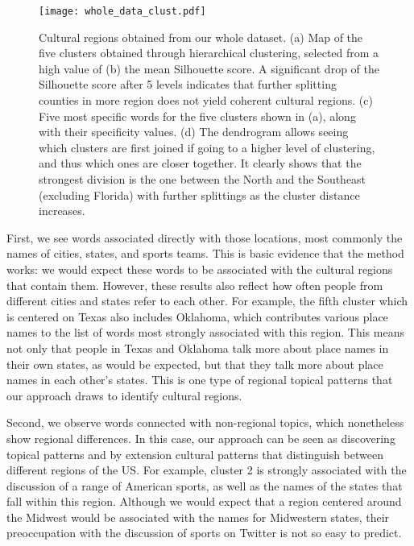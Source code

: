 \documentclass[../thesis.tex]{subfiles}
\begin{document}
\begin{figure}[ht!]
\centering
  \texttt{[image: whole\_data\_clust.pdf]}
  \caption{Cultural regions obtained from our whole dataset. (a) Map of the five
  clusters obtained through hierarchical clustering, selected from a high value of (b)
  the mean Silhouette score. A significant drop of the Silhouette score after 5 levels
  indicates that further splitting counties in more region does not yield coherent
  cultural regions. (c) Five most specific words for the five clusters shown in (a),
  along with their specificity values. (d) The dendrogram allows seeing which clusters
  are first joined if going to a higher level of clustering, and thus which ones are
  closer together. It clearly shows that the strongest division is the one between the
  North and the Southeast (excluding Florida) with further splittings as the cluster
  distance increases.}
  \label{fig:whole_data_clust}
\end{figure}  

First, we see words associated directly with those locations, most commonly the names of
cities, states, and sports teams. This is basic evidence that the method works: we would
expect these words to be associated with the cultural regions that contain them.
However, these results also reflect how often people from different cities and states
refer to each other. For example, the fifth cluster which is centered on Texas also
includes Oklahoma, which contributes various place names to the list of words most
strongly associated with this region. This means not only that people in Texas and
Oklahoma talk more about place names in their own states, as would be expected, but that
they talk more about place names in each other's states. This is one type of regional
topical patterns that our approach draws to identify cultural regions.

Second, we observe words connected with non-regional topics, which nonetheless show
regional differences. In this case, our approach can be seen as discovering topical
patterns and by extension cultural patterns that distinguish between different regions
of the US. For example, cluster 2 is strongly associated with the discussion of a range
of American sports, as well as the names of the states that fall within this region.
Although we would expect that a region centered around the Midwest would be associated
with the names for Midwestern states, their preoccupation with the discussion of sports
on Twitter is not so easy to predict. 
\end{document}
